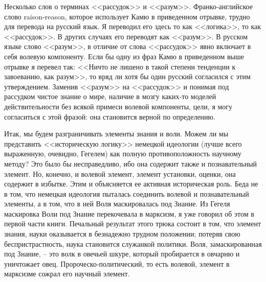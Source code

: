 \documentclass{book}
\begin{document}
Несколько слов о терминах <<рассудок>> и <<разум>>. Франко‑английское слово raison‑reason, которое использует Камю в приведенном отрывке, трудно для перевода на русский язык. Я переводил его здесь то как <<логика>>, то как <<рассудок>>. В других случаях его переводят как <<разум>>. В русском языке слово <<разум>>, в отличие от слова <<рассудок>> явно включает в себя волевую компоненту. Если бы одну из фраз Камю в при­веденном выше отрывке я перевел так: <<Ничто не лишено в такой степени тенденции к завоеванию, как разум>>, то вряд ли хотя бы один русский согласился с этим утверждением. Заменив <<разум>> на <<рассудок>> и понимая под рассудком чистое знание о мире, наличие в мозгу каких‑то моделей действительности без всякой примеси волевой компоненты, цели, я могу согласиться с этой фразой: она становится верной по определению.

Итак, мы будем разграничивать элементы знания и воли. Можем ли мы представить <<историческую логику>> немецкой идеологии (лучше всего выраженную, очевидно, Гегелем) как пол­ную противоположность научному методу? Это было бы несправедливо, ибо она содержит также и познавательный элемент. Но, конечно, и волевой элемент, элемент установки, оценки, она содержит в избытке. Этим и объясняется ее активная исто­рическая роль. Беда не в том, что немецкая идеология пыталась соединить волевой и познавательный элементы, а в том, что в ней Воля маскировалась под Знание. Из Гегеля маскировка Воли под Знание перекочевала в марксизм, я уже говорил об этом в первой части книги. Печальный результат этого трюка состоит в том, что элемент знания, науки оказывается в безнадежно трудном положении; потеряв свою беспристрастность, наука становится служанкой политики. Воля, замаскированная под Знание, -- это волк в овечьей шкуре, который пробирается в овчарню и уничтожает овец. Пророческо‑политический, то есть волевой, элемент в марксизме сожрал его научный элемент.
\end{document}
